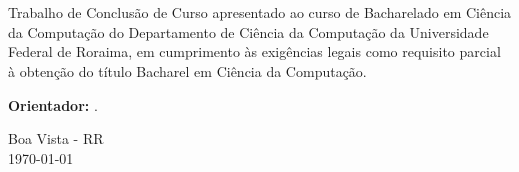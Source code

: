 \begin{titlepage}
    \begin{center}
        {\bfseries\LARGE 
            \makeatletter
            \@title
            \makeatother
        }\\[4cm]

        {\Large 
            \makeatletter
            \@author
            \makeatother
        }\\[4cm]

        \begin{flushright}
            \parbox{9cm}{\setlength{\parindent}{0pt}
            Trabalho de Conclusão de Curso apresentado ao curso de Bacharelado em Ciência da Computação do Departamento de Ciência da Computação da Universidade Federal de Roraima, em cumprimento às exigências legais como requisito parcial à obtenção do título Bacharel em Ciência da Computação.
            }
        \end{flushright}

        \begin{flushright}
            \parbox{9cm}{\setlength{\parindent}{0pt}
            \textbf{Orientador:} \getorientador.
            }
        \end{flushright}
        

        \vfill

        {\large Boa Vista - RR\\
        \today}
    \end{center}
\end{titlepage}

